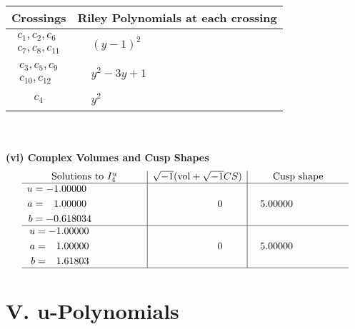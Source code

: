 \documentclass[1p]{elsarticle_modified}
\theoremstyle{definition}
\newcommand{\I}{\sqrt{-1}}
\begin{document}
\begin{tabular}{m{50pt}|m{274pt}}
Crossings & \hspace{64pt}Riley Polynomials at each crossing \\
\hline $$\begin{aligned}c_{1},c_{2},c_{6}\\c_{7},c_{8},c_{11}\end{aligned}$$&$\begin{aligned}
&(y-1)^2
\end{aligned}$\\
\hline $$\begin{aligned}c_{3},c_{5},c_{9}\\c_{10},c_{12}\end{aligned}$$&$\begin{aligned}
&y^2-3 y+1
\end{aligned}$\\
\hline $$\begin{aligned}c_{4}\end{aligned}$$&$\begin{aligned}
&y^2
\end{aligned}$\\
\hline
\end{tabular}\\~\\
\newpage\flushleft \textbf{(vi) Complex Volumes and Cusp Shapes}
$$\begin{array}{c|c|c}  
\text{Solutions to }I^u_{4}& \I (\text{vol} + \sqrt{-1}CS) & \text{Cusp shape}\\
 \hline 
\begin{aligned}
u &= -1.00000\phantom{ +0.000000I} \\
a &= \phantom{-}1.00000\phantom{ +0.000000I} \\
b &= -0.618034\phantom{ +0.000000I}\end{aligned}
 & \phantom{-0.000000 } 0 & \phantom{-}5.00000\phantom{ +0.000000I} \\ \hline\begin{aligned}
u &= -1.00000\phantom{ +0.000000I} \\
a &= \phantom{-}1.00000\phantom{ +0.000000I} \\
b &= \phantom{-}1.61803\phantom{ +0.000000I}\end{aligned}
 & \phantom{-0.000000 } 0 & \phantom{-}5.00000\phantom{ +0.000000I}\\
 \hline 
 \end{array}$$\newpage
\newpage\renewcommand{\arraystretch}{1}
\centering \section*{ V. u-Polynomials}
\end{document}
